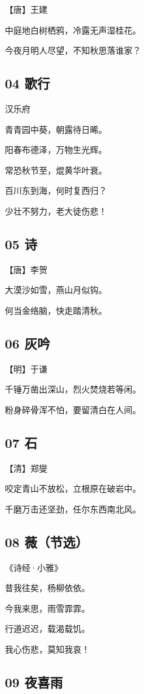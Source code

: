 \documentclass[a6paper, 12pt]{article}
\begin{document}
【唐】王建

中庭地白树栖鸦，冷露无声湿桂花。

今夜月明人尽望，不知秋思落谁家？

\subsection*{04 歌行}

汉乐府

青青园中葵，朝露待日晞。

阳春布德泽，万物生光辉。

常恐秋节至，焜黄华叶衰。

百川东到海，何时复西归？

少壮不努力，老大徒伤悲！

\subsection*{05 诗}

【唐】李贺

大漠沙如雪，燕山月似钩。

何当金络脑，快走踏清秋。

\subsection*{06 灰吟}

【明】于谦

千锤万凿出深山，烈火焚烧若等闲。

粉身碎骨浑不怕，要留清白在人间。

\subsection*{07 石}

【清】郑燮

咬定青山不放松，立根原在破岩中。

千磨万击还坚劲，任尔东西南北风。

\subsection*{08 薇（节选）}

《诗经·小雅》

昔我往矣，杨柳依依。

今我来思，雨雪霏霏。

行道迟迟，载渴载饥。

我心伤悲，莫知我哀！

\subsection*{09 夜喜雨}
\end{document}
